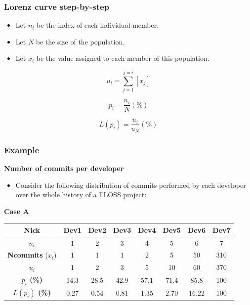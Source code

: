 
\begin{frame}
\frametitle{Lorenz curve step-by-step}

\begin{itemize}
 \item Let $n_i$ be the index of each individual member.
 \item Let $N$ be the size of the population.
 \item Let $x_i$ be the value assigned to each member of this population.
\end{itemize}

\begin{equation}
 u_i=\sum_{j=1}^{j=i}[x_j]
\end{equation}

\begin{equation}
 p_i=\frac{n_i}{N} (\%)
\end{equation}

\begin{equation}
 L(p_i)=\frac{u_i}{u_N} (\%)
\end{equation}


\end{frame}


\begin{frame}
\frametitle{Example}

\textbf{Number of commits per developer}
\begin{itemize}
\item Consider the following distribution of commits performed by each developer over
the whole history of a FLOSS project:
\end{itemize}

\textbf{Case A}
\begin{tabular}{|c|c|c|c|c|c|c|c|}
\hline
\textbf{Nick} & Dev1 & Dev2 & Dev3 & Dev4 & Dev5 & Dev6 & Dev7 \\
\hline
$n_i$ & 1 & 2 & 3 & 4 & 5 & 6 & 7 \\
\hline 
\textbf{Ncommits} ($x_i$) & 1 & 1 & 1& 2 & 5 & 50 & 310 \\
\hline
\textbf{$u_i$} & 1 & 2 & 3 & 5 & 10 & 60 & 370 \\
\hline
\textbf{$p_i$ (\%)} & 14.3 & 28.5 & 42.9 & 57.1 & 71.4 & 85.8 & 100 \\
\hline
\textbf{$L(p_i)$ (\%)} & 0.27 & 0.54 & 0.81 & 1.35 & 2.70 & 16.22 & 100 \\
\hline
\end{tabular}

\end{frame}

